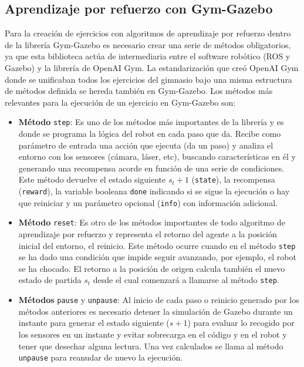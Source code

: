 \subsection{Aprendizaje por refuerzo con Gym-Gazebo}

Para la creación de ejercicios con algoritmos de aprendizaje por refuerzo dentro de la librería Gym-Gazebo es necesario crear una serie de métodos obligatorios, ya que esta biblioteca actúa de intermediaria entre el software robótico (ROS y Gazebo) y la librería de OpenAI Gym. La estandarización que creó OpenAI Gym donde se unificaban todos los ejercicios del gimnasio bajo una misma estructura de métodos definida se hereda también en Gym-Gazebo. Los métodos más relevantes para la ejecución de un ejercicio en Gym-Gazebo son:\\

\begin{itemize}
    \item \textbf{Método} \texttt{step}: Es uno de los métodos más importantes de la librería y es donde se programa la lógica del robot en cada paso que da. Recibe como parámetro de entrada una acción que ejecuta (da un paso) y analiza el entorno con los sensores (cámara, láser, etc), buscando características en él y generando una recompensa acorde en función de una serie de condiciones. Este método devuelve el estado siguiente $s_t+1$ (\texttt{state}), la recompensa (\texttt{reward}), la variable booleana \texttt{done} indicando si se sigue la ejecución o hay que reiniciar y un parámetro opcional (\texttt{info}) con información adicional.\\
    \item \textbf{Método} \texttt{reset}: Es otro de los métodos importantes de todo algoritmo de aprendizaje por refuerzo y representa el retorno del agente a la posición inicial del entorno, el reinicio. Este método ocurre cuando en el método \texttt{step} se ha dado una condición que impide seguir avanzando, por ejemplo, el robot se ha chocado. El retorno a la posición de origen calcula también el nuevo estado de partida $s_t$ desde el cual comenzará a llamarse al método \texttt{step}.\\
    \item \textbf{Métodos} \texttt{pause} y \texttt{unpause}: Al inicio de cada paso o reinicio generado por los métodos anteriores es necesario detener la simulación de Gazebo durante un instante para generar el estado siguiente ($s+1$) para evaluar lo recogido por los sensores en un instante y evitar sobrecarga en el código y en el robot y tener que desechar alguna lectura. Una vez calculados se llama al método \texttt{unpause} para reanudar de nuevo la ejecución.\\
\end{itemize}

